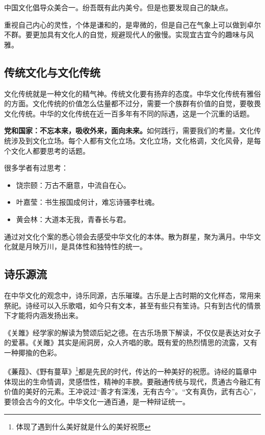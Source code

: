 \documentclass[blue,iPad,cn]{elegantnote}
\begin{document}
中国文化倡导众美合一。纷吾既有此内美兮。但是也要发现自己的缺点。

重视自己内心的灵性，个体是谦和的，是卑微的，但是自己在气象上可以做到卓尔不群。要更加具有文化人的自觉，规避现代人的傲慢。实现宜古宜今的趣味与风雅。

\subsection{传统文化与文化传统}

文化传统就是一种文化的精气神。传统文化要有扬弃的态度。中华文化传统有雅俗的方面。文化传统的价值怎么估量都不过分，需要一个族群有价值的自觉，要敬畏文化传统。中华的文化传统在近一百多年有不同的际遇，这是一个沉重的话题。

\textbf{党和国家：不忘本来，吸收外来，面向未来。}如何践行，需要我们的考量。文化传统涉及到文化立场。每个人都有文化立场。文化立场，文化格调，文化风骨，是每个文化人都要思考的话题。

很多学者有过思考：

\begin{itemize}
	\item 饶宗颐：万古不磨意，中流自在心。
	\item 叶嘉莹：书生报国成何计，难忘诗骚李杜魂。
	\item 黄会林：大道本无我，青春长与君。
\end{itemize}

通过对文化个案的悉心领会去感受中华文化的本体。散为群星，聚为满月。中华文化就是月映万川，是具体性和独特性的统一。

\subsection{诗乐源流}

在中华文化的观念中，诗乐同源，古乐璀璨。古乐是上古时期的文化样态，常用来祭祀。诗经可以入乐歌唱，如今只有文本，甚至有些只有笙诗。只有到古代的情景下才能将内涵发扬出来。

《关雎》经学家的解读为赞颂后妃之德。在古乐场景下解读，不仅仅是表达对女子的爱慕。《关雎》其实是闹洞房，众人齐唱的歌。既有爱的热烈情思的流露，又有一种揶揄的色彩。

《蒹葭》、《野有蔓草》\footnote{体现了遇到什么美好就是什么的美好祝愿}都是先民的时代，传达的一种美好的祝愿。诗经的篇章中体现出的生命情调，灵感悟性，精神的丰腴。要融通传统与现代，贯通古今融汇有价值的美好的元素。王冲说过“善才有深浅，无有古今”。“文有真伪，武有古心”，要领会古今的文化。中华文化一通百通，是一种辩证统一。
\end{document}
